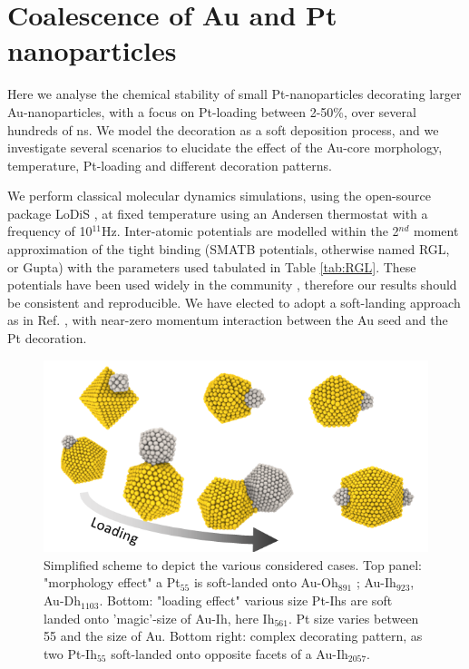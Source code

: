 \section{Coalescence of Au and Pt nanoparticles}
%
Here we analyse the chemical stability of small Pt-nanoparticles decorating larger Au-nanoparticles, with a focus on Pt-loading between 2-50\%, over several hundreds of ns. We model the decoration as a soft deposition process, and we investigate several scenarios to elucidate the effect of the Au-core morphology, temperature, Pt-loading and different decoration patterns. 

%
We perform classical molecular dynamics simulations, using the open-source package LoDiS \cite{LoDiS}, at fixed temperature using an Andersen thermostat with a frequency of 10$^{11}$Hz. Inter-atomic potentials are modelled within the 2$^{nd}$ moment approximation of the tight binding (SMATB potentials, otherwise named RGL, or Gupta) \cite{RGL} with the parameters used tabulated in Table \ref{tab:RGL}.  These potentials have been used widely in the community \cite{LaiaMelt,AgPdAuPdAuPt}, therefore our results should be consistent and reproducible. 
We have elected to adopt a soft-landing approach as in Ref. \cite{Gazzarrini2021}, with  near-zero momentum interaction between the Au seed and the Pt decoration.

\begin{figure}
    \centering
    \includegraphics[width=\textwidth]{figures/MD/AuPt_beginning.png}
    \caption{Simplified scheme to depict the various considered cases. Top panel: "morphology effect" a Pt$_{55}$ is soft-landed onto Au-Oh$_{891}$ ; Au-Ih$_{923}$, Au-Dh$_{1103}$. Bottom: "loading effect" various size Pt-Ihs are soft landed onto 'magic'-size of Au-Ih, here Ih$_{561}$. Pt size varies between 55 and the size of Au. Bottom right: complex decorating pattern, as two Pt-Ih$_{55}$ soft-landed onto opposite facets of a Au-Ih$_{2057}$.}
    \label{fig:beginning}
\end{figure}

